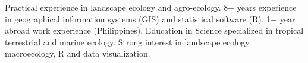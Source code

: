 

\begin{cvparagraph}

Practical experience in landscape ecology and agro-ecology. 8+ years experience in geographical information systems (GIS) and statistical software (R). 1+ year abroad work experience (Philippines). Education in Science specialized in tropical terrestrial and marine ecology. Strong interest in landscape ecology, macroecology, R and data visualization.
\end{cvparagraph}
